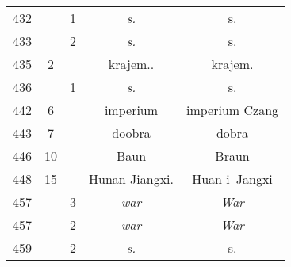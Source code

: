 \documentclass[a4paper,11pt]{article}
\begin{document}
\begin{center}
\begin{tabular}{|c|c|c|c|c|}
    432 & &  1 & \emph{s.} & s. \\
    433 & &  2 & \emph{s.} & s. \\
    435 &  2 & & krajem.. & krajem. \\
    436 & &  1 & \emph{s.} & s. \\
    442 &  6 & & imperium & imperium Czang \\
    443 &  7 & & doobra & dobra \\
    446 & 10 & & Baun & Braun \\
    448 & 15 & & Hunan Jiangxi. & Huan i~Jangxi \\
    457 & &  3 & \emph{war} & \emph{War} \\
    457 & &  2 & \emph{war} & \emph{War} \\
    459 & &  2 & \emph{s.} & s. \\
    \hline
  \end{tabular}


\end{center}
\end{document}
